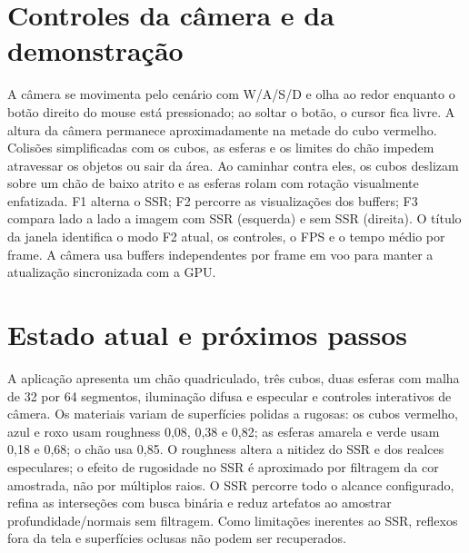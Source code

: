 \documentclass[12pt,a4paper]{article}
\begin{document}
\section{Controles da câmera e da demonstração}
A câmera se movimenta pelo cenário com W/A/S/D e olha ao redor enquanto o botão direito do mouse está pressionado; ao soltar o botão, o cursor fica livre. A altura da câmera permanece aproximadamente na metade do cubo vermelho. Colisões simplificadas com os cubos, as esferas e os limites do chão impedem atravessar os objetos ou sair da área. Ao caminhar contra eles, os cubos deslizam sobre um chão de baixo atrito e as esferas rolam com rotação visualmente enfatizada. F1 alterna o SSR; F2 percorre as visualizações dos buffers; F3 compara lado a lado a imagem com SSR (esquerda) e sem SSR (direita). O título da janela identifica o modo F2 atual, os controles, o FPS e o tempo médio por frame. A câmera usa buffers independentes por frame em voo para manter a atualização sincronizada com a GPU.

\section{Estado atual e próximos passos}
A aplicação apresenta um chão quadriculado, três cubos, duas esferas com malha de 32 por 64 segmentos, iluminação difusa e especular e controles interativos de câmera. Os materiais variam de superfícies polidas a rugosas: os cubos vermelho, azul e roxo usam roughness 0,08, 0,38 e 0,82; as esferas amarela e verde usam 0,18 e 0,68; o chão usa 0,85. O roughness altera a nitidez do SSR e dos realces especulares; o efeito de rugosidade no SSR é aproximado por filtragem da cor amostrada, não por múltiplos raios. O SSR percorre todo o alcance configurado, refina as interseções com busca binária e reduz artefatos ao amostrar profundidade/normais sem filtragem. Como limitações inerentes ao SSR, reflexos fora da tela e superfícies oclusas não podem ser recuperados.
\end{document}
